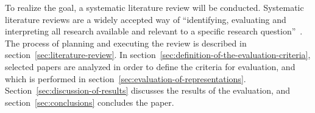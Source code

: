 To realize the goal, a systematic literature review will be conducted.
Systematic literature reviews are a widely accepted way of \enquote{identifying, evaluating and interpreting all research available and relevant to a specific research question}~\cite{kitchenham_guidelines_2007}.
The process of planning and executing the review is described in section~\ref{sec:literature-review}.
In section~\ref{sec:definition-of-the-evaluation-criteria}, selected papers are analyzed in order to define the criteria for evaluation, and which is performed in section~\ref{sec:evaluation-of-representations}.
Section~\ref{sec:discussion-of-results} discusses the results of the evaluation, and section~\ref{sec:conclusions} concludes the paper.
